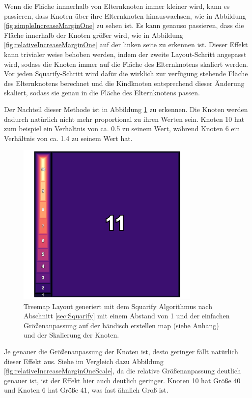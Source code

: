 Wenn die Fläche innnerhalb von Elternknoten immer kleiner wird, kann es passieren, dass Knoten über ihre Elternknoten hinauswachsen, wie in Abbildung \ref{fig:simpleIncreaseMarginOne} zu sehen ist. Es kann genauso passieren, dass die Fläche innerhalb der Knoten größer wird, wie in Abbildung \ref{fig:relativeIncreaseMarginOne} auf der linken seite zu erkennen ist. Dieser Effekt kann trivialer weise behoben werden, indem der zweite Layout-Schritt angepasst wird, sodass die Knoten immer auf die Fläche des Elternknotens skaliert werden. 
Vor jeden Squarify-Schritt wird dafür die wirklich zur verfügung stehende Fläche des Elternknotens berechnet und die Kindknoten entsprechend dieser Änderung skaliert, sodass sie genau in die Fläche des Elternknotens passen.

Der Nachteil dieser Methode ist in Abbildung \ref{fig:simpleIncreaseMarginOneScale} zu erkennen. Die Knoten werden dadurch natürlich nicht mehr proportional zu ihren Werten sein. Knoten 10 hat zum beispiel ein Verhältnis von ca. 0.5 zu seinem Wert, während Knoten 6 ein Verhältnis von ca. 1.4 zu seinem Wert hat.

\begin{figure}
    \centering
    \includegraphics[width=0.8\textwidth]{images/simpleIncreaseMarginOneScale.png}
    \caption{Treemap Layout generiert mit dem Squarify Algorithmus nach Abschnitt \ref{sec:Squarify} mit einem Abstand von 1 und der einfachen Größenanpassung auf der händisch erstellen map (siehe Anhang) und der Skalierung der Knoten.}
    \label{fig:simpleIncreaseMarginOneScale}
\end{figure}

Je genauer die Größenanpassung der Knoten ist, desto geringer fällt natürlich dieser Effekt aus. Siehe im Vergleich dazu Abbildung \ref{fig:relativeIncreaseMarginOneScale}, da die relative Größenanpassung deutlich genauer ist, ist der Effekt hier auch deutlich geringer. Knoten 10 hat Größe 40 und Knoten 6 hat Größe 41, was fast ähnlich Groß ist.

